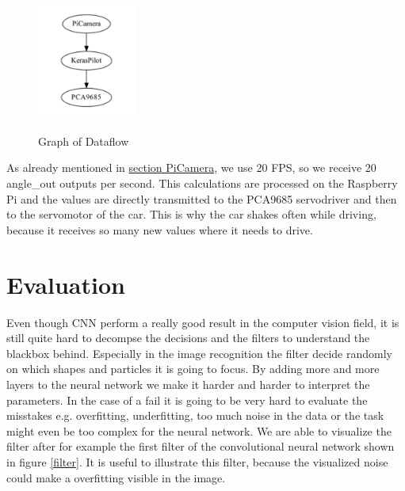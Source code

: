 \documentclass[journal]{IEEEtran}
\begin{document}
\begin{figure}
  \begin{center}
  \includegraphics[width=1.3in]{photo/autonom.png}\\
  \caption{Graph of Dataflow}\label{autonom}
  \end{center}
\end{figure}

As already mentioned in \hyperref[cameramodule]{section PiCamera}, we use 20 FPS, so we receive 20 angle\_out outputs per second. This calculations are processed on the Raspberry Pi and the values are directly transmitted to the PCA9685 servodriver and then to the servomotor of the car. This is why the car shakes often while driving, because it receives so many new values where it needs to drive.


\section{Evaluation}

Even though CNN perform a really good result in the computer vision field, it is still quite hard to decompse the decisions and the filters to understand the blackbox behind. Especially in the image recognition the filter decide randomly on which shapes and particles it is going to focus. By adding more and more layers to the neural network we make it harder and harder to interpret the parameters. In the case of a fail it is going to be very hard to evaluate the misstakes e.g. overfitting, underfitting, too much noise in the data or the task might even be too complex for the neural network. We are able to visualize the filter after for example the first filter of the convolutional neural network shown in figure \ref{filter}. It is useful to illustrate this filter, because the visualized noise could make a overfitting visible in the image. \\
\end{document}
